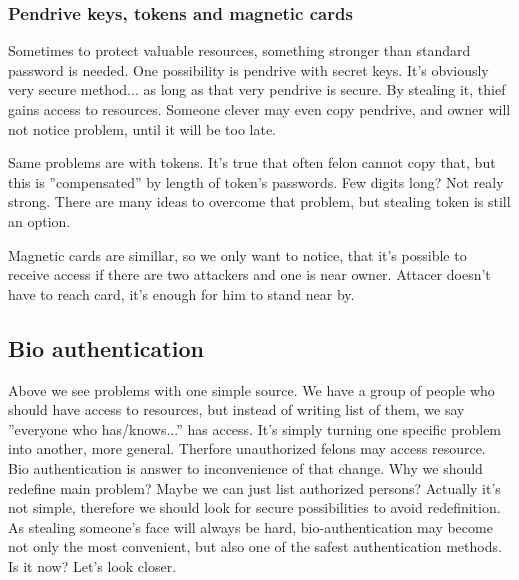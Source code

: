         \subsubsection*{Pendrive keys, tokens and magnetic cards}
            Sometimes to protect valuable resources,
            something stronger than standard password is needed.
            One possibility is pendrive with secret keys.
            It's obviously very secure method...
            as long as that very pendrive is secure.
            By stealing it, thief gains access to resources.
            Someone clever may even copy pendrive, and
            owner will not notice problem,
            until it will be too late.

            Same problems are with tokens.
            It's true that often felon cannot copy that,
            but this is ''compensated'' by length of token's passwords.
            Few digits long? Not realy strong.
            There are many ideas to overcome that problem,
            but stealing token is still an option.

            Magnetic cards are simillar, so we only want to notice,
            that it's possible to receive access if there are
            two attackers and one is near owner.
            Attacer doesn't have to reach card, it's enough
            for him to stand near by. %

    \subsection{Bio authentication}
        Above we see problems with one simple source.
        We have a group of people who should have access to resources,
        but instead of writing list of them, we
        say ''everyone who has/knows...'' has access.
        It's simply turning one specific problem into another,
        more general. Therfore unauthorized felons may
        access resource.\\
        Bio authentication is answer to inconvenience of that change.
        Why we should redefine main problem? Maybe we
        can just list authorized persons?
        Actually it's not simple, therefore we should
        look for secure possibilities to avoid redefinition.\\
        As stealing someone's face will always be hard,
        bio-authentication may become not only the most
        convenient, but also one of the safest
        authentication methods.\\
        Is it now? Let's look closer.

